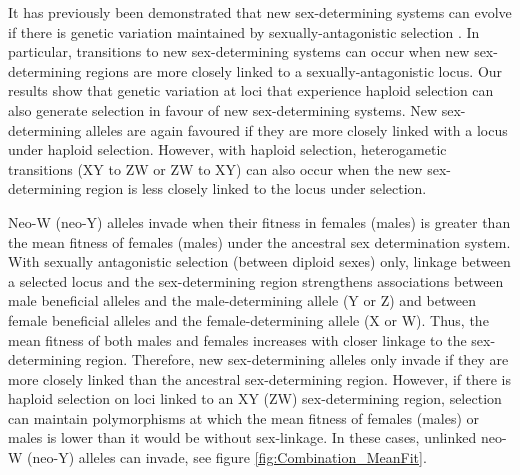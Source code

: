 \documentclass[12pt]{article}
\begin{document}
It has previously been demonstrated that new sex-determining systems can evolve if there is genetic variation maintained by sexually-antagonistic selection \citep{vanDoorn:2007eu,vanDoorn:2010hu}. 
In particular, transitions to new sex-determining systems can occur when new sex-determining regions are more closely linked to a sexually-antagonistic locus.
Our results show that genetic variation at loci that experience haploid selection can also generate selection in favour of new sex-determining systems. 
New sex-determining alleles are again favoured if they are more closely linked with a locus under haploid selection.
However, with haploid selection, heterogametic transitions (XY to ZW or ZW to XY) can also occur when the new sex-determining region is less closely linked to the locus under selection. 

Neo-W (neo-Y) alleles invade when their fitness in females (males) is greater than the mean fitness of females (males) under the ancestral sex determination system.
With sexually antagonistic selection (between diploid sexes) only, linkage between a selected locus and the sex-determining region strengthens associations between male beneficial alleles and the male-determining allele (Y or Z) and between female beneficial alleles and the female-determining allele (X or W). 
Thus, the mean fitness of both males and females increases with closer linkage to the sex-determining region. 
Therefore, new sex-determining alleles only invade if they are more closely linked than the ancestral sex-determining region. 
However, if there is haploid selection on loci linked to an XY (ZW) sex-determining region, selection can maintain polymorphisms at which the mean fitness of females (males) or males is lower than it would be without sex-linkage. 
In these cases, unlinked neo-W (neo-Y) alleles can invade, see figure \ref{fig:Combination_MeanFit}. 


\end{document}
